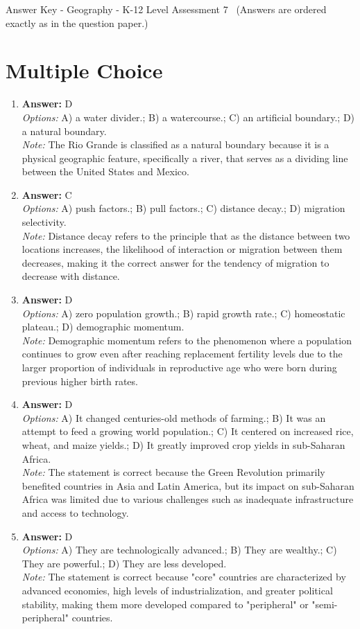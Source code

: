 \documentclass[12pt]{article}
\begin{document}
\begin{center}
Answer Key - Geography - K-12 Level Assessment 7 \
\small (Answers are ordered exactly as in the question paper.)
\end{center}

\section*{Multiple Choice}
\begin{enumerate}[label=\arabic*.]
\item \textbf{Answer:} D
\\ \textit{Options:} A) a water divider.; B) a watercourse.; C) an artificial boundary.; D) a natural boundary.
\\ \textit{Note:} The Rio Grande is classified as a natural boundary because it is a physical geographic feature, specifically a river, that serves as a dividing line between the United States and Mexico.
\item \textbf{Answer:} C
\\ \textit{Options:} A) push factors.; B) pull factors.; C) distance decay.; D) migration selectivity.
\\ \textit{Note:} Distance decay refers to the principle that as the distance between two locations increases, the likelihood of interaction or migration between them decreases, making it the correct answer for the tendency of migration to decrease with distance.
\item \textbf{Answer:} D
\\ \textit{Options:} A) zero population growth.; B) rapid growth rate.; C) homeostatic plateau.; D) demographic momentum.
\\ \textit{Note:} Demographic momentum refers to the phenomenon where a population continues to grow even after reaching replacement fertility levels due to the larger proportion of individuals in reproductive age who were born during previous higher birth rates.
\item \textbf{Answer:} D
\\ \textit{Options:} A) It changed centuries-old methods of farming.; B) It was an attempt to feed a growing world population.; C) It centered on increased rice, wheat, and maize yields.; D) It greatly improved crop yields in sub-Saharan Africa.
\\ \textit{Note:} The statement is correct because the Green Revolution primarily benefited countries in Asia and Latin America, but its impact on sub-Saharan Africa was limited due to various challenges such as inadequate infrastructure and access to technology.
\item \textbf{Answer:} D
\\ \textit{Options:} A) They are technologically advanced.; B) They are wealthy.; C) They are powerful.; D) They are less developed.
\\ \textit{Note:} The statement is correct because "core" countries are characterized by advanced economies, high levels of industrialization, and greater political stability, making them more developed compared to "peripheral" or "semi-peripheral" countries.
\end{enumerate}
\end{document}
